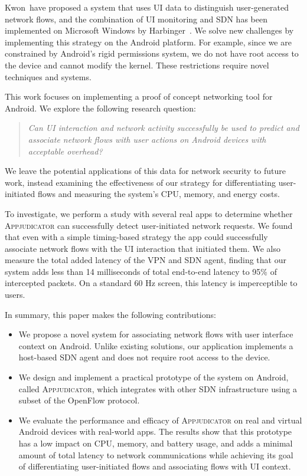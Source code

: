 Kwon~\etal have proposed a system that uses UI data to distinguish
user-generated network flows, and the combination of UI monitoring and SDN has
been implemented on Microsoft Windows by Harbinger~\cite{chuluundorj2019}.  We
solve new challenges by implementing this strategy on the Android platform. For
example, since we are constrained by Android's rigid permissions system, we do
not have root access to the device and cannot modify the kernel. These
restrictions require novel techniques and systems.

This work focuses on implementing a proof of concept networking tool for
Android. We explore the following research question:
\begin{quote}
	\textit{Can UI interaction and network activity successfully be used to 
		predict and associate network flows with user actions on Android devices
		with acceptable overhead?}
\end{quote}
We leave the potential applications of this data for network security to future
work, instead examining the effectiveness of our strategy for differentiating
user-initiated flows and measuring the system's CPU, memory, and energy costs.

To investigate, we perform a study with several real apps to determine whether
\textsc{Appjudicator} can successfully detect user-initiated network requests.
We found that even with a simple timing-based strategy the app could
successfully associate network flows with the UI interaction that initiated
them. We also measure the total added latency of the VPN and SDN agent, finding
that our system adds less than 14 milliseconds of total end-to-end latency to
95\% of intercepted packets. On a standard 60 Hz screen, this latency is
imperceptible to users.

In summary, this paper makes the following contributions:

\begin{itemize}
	\item We propose a novel system for associating network flows with user
		interface context on Android. Unlike existing solutions, our application
		implements a host-based SDN agent and does not require root access to
		the device.
	\item We design and implement a practical prototype of the system on
		Android, called \textsc{Appjudicator}, which integrates with other SDN
		infrastructure using a subset of the OpenFlow protocol.
	\item We evaluate the performance and efficacy of \textsc{Appjudicator} on
		real and virtual Android devices with real-world apps. The results show
		that this prototype has a low impact on CPU, memory, and battery usage,
		and adds a minimal amount of total latency to network communications
		while achieving its goal of differentiating user-initiated flows and
		associating flows with UI context.
\end{itemize}

\newpage
